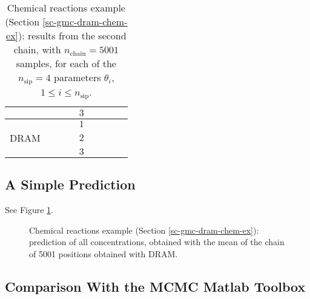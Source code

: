 \begin{table}[h!]
\begin{center}
\begin{tabular}{|c|c|c|c|c|c|c|c|c|}
\cline{5-9}
       &          &                        &                        & $3$ &                          &                                &                        &                               \\
\hline
\hline
       &          &                        &                        & $1$ &                          &                                &                        &                               \\
\cline{5-9}
DRAM   &          &                        &                        & $2$ &                          &                                &                        &                               \\
\cline{5-9}
       &          &                        &                        & $3$ &                          &                                &                        &                               \\
\hline
\end{tabular}
\caption{Chemical reactions example (Section \ref{sc-gmc-dram-chem-ex}):
results from the second chain, with $n_{\text{chain}}=5001$ samples,
for each of the $n_{\text{sip}}=4$ parameters $\theta_i$, $1\leqslant i\leqslant n_{\text{sip}}$.
}
\label{tab-dram-chem-ex-results-2}
\end{center}
\end{table}

\clearpage
\subsection{A Simple Prediction}

See Figure \ref{fig-dram-chem-ex-prediction}.

\begin{figure}[h!]
\begin{center}
\end{center}
\caption{Chemical reactions example (Section \ref{sc-gmc-dram-chem-ex}):
prediction of all concentrations, obtained with the mean of the chain of 5001 positions obtained with DRAM.
}
\label{fig-dram-chem-ex-prediction}
\end{figure}

\clearpage
\subsection{Comparison With the MCMC Matlab Toolbox}

